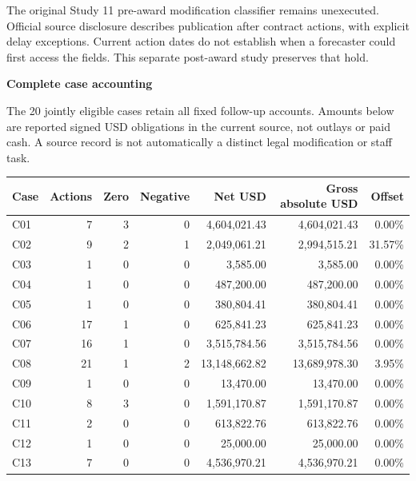 \documentclass[11pt,letterpaper]{article}
\newcommand{\heading}[1]{\vspace{5pt}{\large\bfseries #1}\par}
\newcommand{\BoundA}{7}
\newcommand{\BoundB}{3}
\newcommand{\BoundC}{0}
\newcommand{\BoundD}{4,604,021.43}
\newcommand{\BoundE}{4,604,021.43}
\newcommand{\BoundF}{0.00}
\newcommand{\BoundG}{9}
\newcommand{\BoundH}{2}
\newcommand{\BoundI}{1}
\newcommand{\BoundJ}{2,049,061.21}
\newcommand{\BoundK}{2,994,515.21}
\newcommand{\BoundL}{31.57}
\newcommand{\BoundM}{1}
\newcommand{\BoundN}{0}
\newcommand{\BoundO}{0}
\newcommand{\BoundP}{3,585.00}
\newcommand{\BoundQ}{3,585.00}
\newcommand{\BoundR}{0.00}
\newcommand{\BoundS}{1}
\newcommand{\BoundT}{0}
\newcommand{\BoundU}{0}
\newcommand{\BoundV}{487,200.00}
\newcommand{\BoundW}{487,200.00}
\newcommand{\BoundX}{0.00}
\newcommand{\BoundY}{1}
\newcommand{\BoundZ}{0}
\newcommand{\BoundAA}{0}
\newcommand{\BoundAB}{380,804.41}
\newcommand{\BoundAC}{380,804.41}
\newcommand{\BoundAD}{0.00}
\newcommand{\BoundAE}{17}
\newcommand{\BoundAF}{1}
\newcommand{\BoundAG}{0}
\newcommand{\BoundAH}{625,841.23}
\newcommand{\BoundAI}{625,841.23}
\newcommand{\BoundAJ}{0.00}
\newcommand{\BoundAK}{16}
\newcommand{\BoundAL}{1}
\newcommand{\BoundAM}{0}
\newcommand{\BoundAN}{3,515,784.56}
\newcommand{\BoundAO}{3,515,784.56}
\newcommand{\BoundAP}{0.00}
\newcommand{\BoundAQ}{21}
\newcommand{\BoundAR}{1}
\newcommand{\BoundAS}{2}
\newcommand{\BoundAT}{13,148,662.82}
\newcommand{\BoundAU}{13,689,978.30}
\newcommand{\BoundAV}{3.95}
\newcommand{\BoundAW}{1}
\newcommand{\BoundAX}{0}
\newcommand{\BoundAY}{0}
\newcommand{\BoundAZ}{13,470.00}
\newcommand{\BoundBA}{13,470.00}
\newcommand{\BoundBB}{0.00}
\newcommand{\BoundBC}{8}
\newcommand{\BoundBD}{3}
\newcommand{\BoundBE}{0}
\newcommand{\BoundBF}{1,591,170.87}
\newcommand{\BoundBG}{1,591,170.87}
\newcommand{\BoundBH}{0.00}
\newcommand{\BoundBI}{2}
\newcommand{\BoundBJ}{0}
\newcommand{\BoundBK}{0}
\newcommand{\BoundBL}{613,822.76}
\newcommand{\BoundBM}{613,822.76}
\newcommand{\BoundBN}{0.00}
\newcommand{\BoundBO}{1}
\newcommand{\BoundBP}{0}
\newcommand{\BoundBQ}{0}
\newcommand{\BoundBR}{25,000.00}
\newcommand{\BoundBS}{25,000.00}
\newcommand{\BoundBT}{0.00}
\newcommand{\BoundBU}{7}
\newcommand{\BoundBV}{0}
\newcommand{\BoundBW}{0}
\newcommand{\BoundBX}{4,536,970.21}
\newcommand{\BoundBY}{4,536,970.21}
\newcommand{\BoundBZ}{0.00}
\newcommand{\BoundEC}{20}
\begin{document}
\heading{Original proposal remains unexecuted}
The original Study 11 pre-award modification classifier remains unexecuted. Official source disclosure describes publication after contract actions, with explicit delay exceptions. Current action dates do not establish when a forecaster could first access the fields. This separate post-award study preserves that hold.
\newpage
{\Large\bfseries Complete case accounting\par}
The \BoundEC{} jointly eligible cases retain all fixed follow-up accounts. Amounts below are reported signed USD obligations in the current source, not outlays or paid cash. A source record is not automatically a distinct legal modification or staff task.

{\small
\setlength{\tabcolsep}{5pt}
\begin{tabular}{@{}lrrrrrr@{}}
\toprule
Case & Actions & Zero & Negative & Net USD & Gross absolute USD & Offset\\
\midrule
C01 & \BoundA{} & \BoundB{} & \BoundC{} & \BoundD{} & \BoundE{} & \BoundF{}\% \\
C02 & \BoundG{} & \BoundH{} & \BoundI{} & \BoundJ{} & \BoundK{} & \BoundL{}\% \\
C03 & \BoundM{} & \BoundN{} & \BoundO{} & \BoundP{} & \BoundQ{} & \BoundR{}\% \\
C04 & \BoundS{} & \BoundT{} & \BoundU{} & \BoundV{} & \BoundW{} & \BoundX{}\% \\
C05 & \BoundY{} & \BoundZ{} & \BoundAA{} & \BoundAB{} & \BoundAC{} & \BoundAD{}\% \\
C06 & \BoundAE{} & \BoundAF{} & \BoundAG{} & \BoundAH{} & \BoundAI{} & \BoundAJ{}\% \\
C07 & \BoundAK{} & \BoundAL{} & \BoundAM{} & \BoundAN{} & \BoundAO{} & \BoundAP{}\% \\
C08 & \BoundAQ{} & \BoundAR{} & \BoundAS{} & \BoundAT{} & \BoundAU{} & \BoundAV{}\% \\
C09 & \BoundAW{} & \BoundAX{} & \BoundAY{} & \BoundAZ{} & \BoundBA{} & \BoundBB{}\% \\
C10 & \BoundBC{} & \BoundBD{} & \BoundBE{} & \BoundBF{} & \BoundBG{} & \BoundBH{}\% \\
C11 & \BoundBI{} & \BoundBJ{} & \BoundBK{} & \BoundBL{} & \BoundBM{} & \BoundBN{}\% \\
C12 & \BoundBO{} & \BoundBP{} & \BoundBQ{} & \BoundBR{} & \BoundBS{} & \BoundBT{}\% \\
C13 & \BoundBU{} & \BoundBV{} & \BoundBW{} & \BoundBX{} & \BoundBY{} & \BoundBZ{}\% \\

\end{tabular}}
\end{document}
